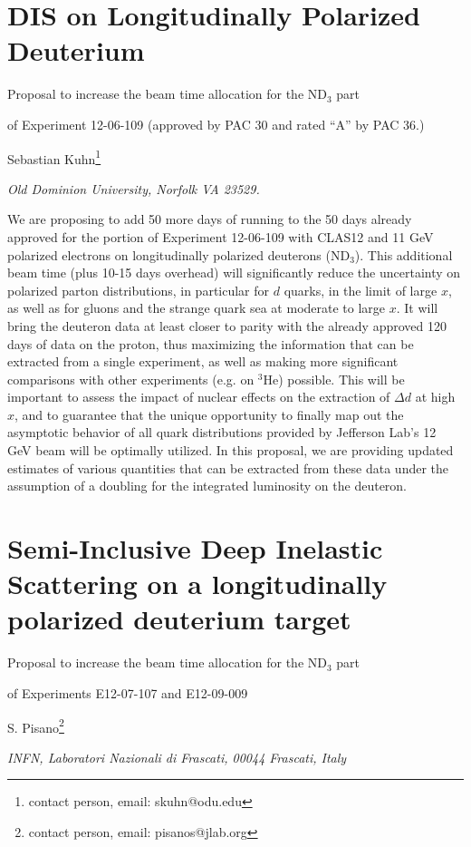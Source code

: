 \documentclass[a4paper,12pt]{report}
\begin{document}
\chapter{DIS on Longitudinally Polarized Deuterium}
\centerline{ Proposal to increase the beam time allocation for the ND$_3$ part}
\centerline{of Experiment 12-06-109 (approved by PAC 30 and rated ``A'' by PAC 36.)}
\vskip 0.4cm
\centerline{Sebastian Kuhn\footnote{contact person, email: skuhn@odu.edu}}
\centerline{\it  Old Dominion University, Norfolk VA 23529.}

\abstract
{We are proposing to add 50 more days of running to the 50 days already approved for the portion of Experiment 12-06-109 with CLAS12 and 11 GeV polarized electrons on longitudinally polarized  deuterons (ND$_3$). This additional beam time (plus 10-15 days overhead) will significantly reduce the uncertainty on polarized parton distributions, in particular for $d$ quarks, in the limit of large $x$, as well as for gluons and the strange quark sea at moderate to large $x$. It will bring the deuteron data at least closer to parity with the already approved 120 days of data on the proton, thus maximizing the information that can be extracted from a single experiment, as well as making more significant comparisons with other experiments (e.g. on $^3$He) possible. This will be important to assess the impact of nuclear effects on the extraction of $\Delta d$ at high $x$, and to guarantee that the unique opportunity to finally map out the asymptotic behavior of all quark distributions provided by Jefferson Lab's 12 GeV beam will be optimally utilized. In this proposal, we are providing updated estimates of various quantities that can be extracted from these data under the assumption of a doubling for the integrated luminosity on the deuteron.
}
\newpage
\setcounter{page}{67}

\newpage
\chapter{Semi-Inclusive Deep Inelastic Scattering on a longitudinally polarized deuterium target}
\centerline{Proposal to increase the beam time allocation for the ND$_3$ part}
\centerline{of Experiments E12-07-107 and E12-09-009}
\vskip 0.4cm
\centerline{S. Pisano\footnote{contact person, email: pisanos@jlab.org}}
\centerline{\it INFN, Laboratori Nazionali di Frascati, 00044 Frascati, Italy}
\end{document}
